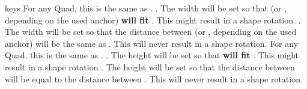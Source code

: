 \documentclass[10pt]{article}
\begin{document}
\begin{describelist*}[30mm]{keys}
   {For any Quad, this is the same as .}
   {. The width will be set so that  (or , depending on the used anchor) \textbf{will fit} . This might result in a shape rotation.} 
   {. The width will be set so that the distance between  (or , depending on the used anchor) will be the same as . This will never result in a shape rotation.}
   {For any Quad, this is the same as .}
   {.   The height will be set so that  \textbf{will fit} . This might result in a shape rotation} 
   {. The height will be set so that the distance between  will be equal to the distance between . This will never result in a shape rotation.}
%  

\end{describelist*}
\end{document}
